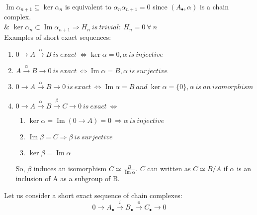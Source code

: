 \documentclass[11pt,a4paper]{report}
\DeclareMathOperator{\Ima}{Im}
\begin{document}
                 $ \Ima\alpha_{n+1} \subseteq \ker\alpha_n$ is equivalent to $\alpha_n\alpha_{n+1} = 0$ since $(A_\bullet, \alpha)$ is a chain complex.\\
                 \& $ \ker\alpha_n \subset \Ima\alpha_{n+1} \Rightarrow H_{n} \ is\ trivial: \ H_{n} = 0 \ \forall \ n $ \\

                Examples of short exact sequences:

                \begin{enumerate}
                \item $ 0 \rightarrow A \xrightarrow{\alpha} B \ is\ exact\ \iff \ker\alpha = 0, \alpha \ is\ injective $
                \item $ A \xrightarrow{\alpha} B \rightarrow 0 \ is\ exact\ \iff \Ima\alpha = B, \alpha \ is\ surjective $
                \item
                  $
                    0 \rightarrow A \xrightarrow{\alpha} B \rightarrow 0 \ is\ exact\ \iff \Ima\alpha = B \ and \ \ker\alpha = \{0\}, \alpha \ is \ an \ isomorphism$ 
                \item
                  $ 0 \rightarrow A \xrightarrow{\alpha} B \xrightarrow{\beta} C \rightarrow 0 \ is\ exact\ \iff $
                   \begin{enumerate}
                    \item 
                     $\ker \alpha = \Ima(0 \rightarrow A) = 0\ \Rightarrow \alpha\ is\ injective$
                    \item
                    $\Ima\beta = C \Rightarrow \beta \ is\ surjective$ 
                    \item
                    $\ker \beta = \Ima\alpha $
                    
                   \end{enumerate}

                    So, $\beta$  induces an isomorphism $C \simeq \frac{B}{\Ima\alpha}$.  
                    $C$ can written as $C \simeq B/A$ if $\alpha$ is an inclusion of A as a subgroup of B.
                \end{enumerate}

                
                Let us consider a short exact sequence of chain complexes: \\
                \[ 
                0 \rightarrow A_\bullet \xrightarrow{i} B_\bullet \xrightarrow{\pi} C_\bullet \rightarrow 0 
                \] 
                
\end{document}

